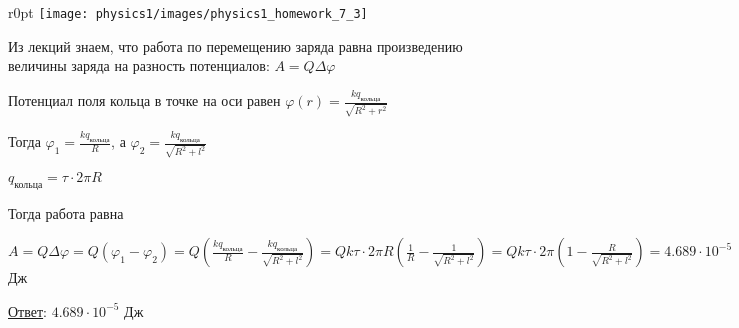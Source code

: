 \documentclass[12pt]{article}
\begin{document}
\begin{minipage}{\textwidth}
    \begin{wrapfigure}{r}{0pt}
        \texttt{[image: physics1/images/physics1\_homework\_7\_3]}
    \end{wrapfigure}

    Из лекций знаем, что работа по перемещению заряда равна произведению величины заряда на разность потенциалов: 
    $A = Q\Delta\varphi$

    Потенциал поля кольца в точке на оси равен $\varphi(r) = \frac{kq_{\text{кольца}}}{\sqrt{R^2 + r^2}}$

    Тогда $\varphi_1 = \frac{kq_{\text{кольца}}}{R}$, а $\varphi_2 = \frac{kq_{\text{кольца}}}{\sqrt{R^2 + l^2}}$

    $q_{\text{кольца}} = \tau \cdot 2\pi R$

    Тогда работа равна 
    
    $A = Q\Delta \varphi = Q(\varphi_1 - \varphi_2) = 
    Q\left(\frac{kq_{\text{кольца}}}{R} - \frac{kq_{\text{кольца}}}{\sqrt{R^2 + l^2}}\right) = 
    Qk\tau \cdot 2\pi R \left(\frac{1}{R} - \frac{1}{\sqrt{R^2 + l^2}}\right) = 
    Qk\tau \cdot 2\pi \left(1 - \frac{R}{\sqrt{R^2 + l^2}}\right) = 4.689 \cdot 10^{-5}$ Дж

\end{minipage}

\bigvspace

\underline{Ответ}: $4.689 \cdot 10^{-5}$ Дж


\end{document}
